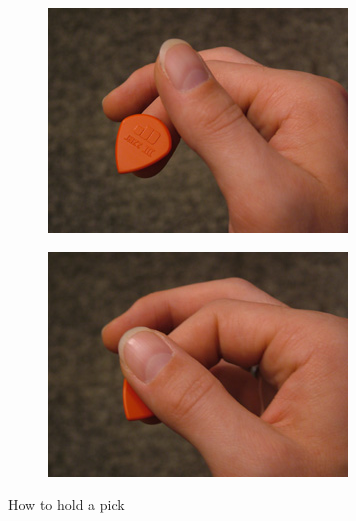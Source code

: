 \begin{figure}[h]
	\begin{subfigure}[b]{0.45\textwidth}
		\includegraphics[width=\textwidth]{../../Images/JustinGuitarPickhold1.jpg}
		\caption{}
		\label{fig:}
	\end{subfigure}
	\hfill
	\begin{subfigure}[b]{0.45\textwidth}
		\includegraphics[width=\textwidth]{../../Images/JustinGuitarPickhold2.jpg}
		\caption{}
		\label{fig:}
	\end{subfigure}
	\caption{How to hold a pick \cite{JustinGuitarPickHolding}}
	\label{fig:how_to_hold_a_pick}
\end{figure}

\newpage

